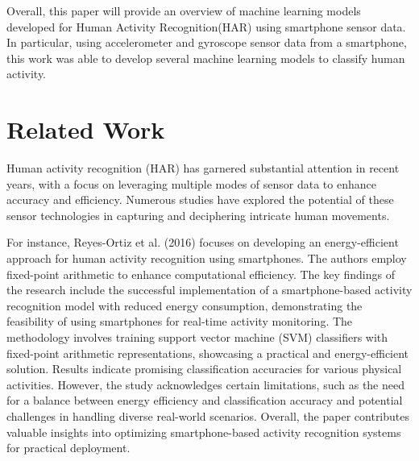 \documentclass[conference]{IEEEtran}
\begin{document}
Overall, this paper will provide an overview of machine learning models developed for Human Activity Recognition(HAR) using smartphone sensor data. In particular, using accelerometer and gyroscope sensor data from a smartphone, this work was able to develop several machine learning models to classify human activity. 

\section{Related Work}
Human activity recognition (HAR) has garnered substantial attention in recent years, with a focus on leveraging multiple modes of sensor data to enhance accuracy and efficiency. Numerous studies have explored the potential of these sensor technologies in capturing and deciphering intricate human movements. \newline 

For instance, Reyes-Ortiz et al. (2016) focuses on developing an energy-efficient approach for human activity recognition using smartphones. The authors employ fixed-point arithmetic to enhance computational efficiency. The key findings of the research include the successful implementation of a smartphone-based activity recognition model with reduced energy consumption, demonstrating the feasibility of using smartphones for real-time activity monitoring. The methodology involves training support vector machine (SVM) classifiers with fixed-point arithmetic representations, showcasing a practical and energy-efficient solution. Results indicate promising classification accuracies for various physical activities. However, the study acknowledges certain limitations, such as the need for a balance between energy efficiency and classification accuracy and potential challenges in handling diverse real-world scenarios. Overall, the paper contributes valuable insights into optimizing smartphone-based activity recognition systems for practical deployment. \newline 
\end{document}
